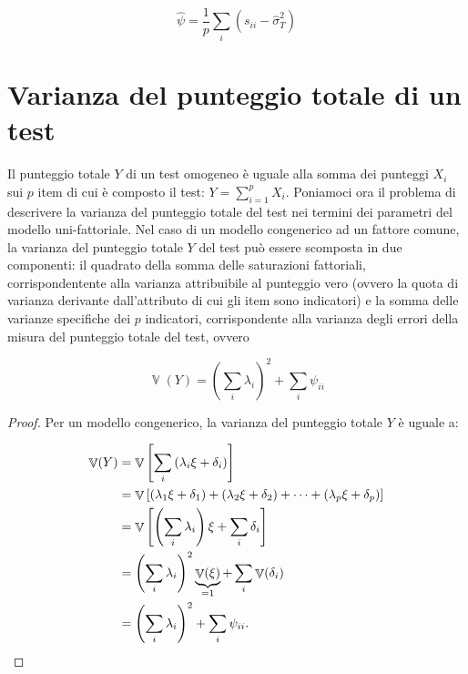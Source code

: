\documentclass[
  11pt,
]{krantz}
\DeclareMathOperator{\V}{\mathbb{V}} %
\theoremstyle{definition}
\theoremstyle{definition}
\theoremstyle{definition}
\theoremstyle{definition}
\theoremstyle{remark}
\begin{document}
\begin{equation}
\hat{\psi} = \frac{1}{p} \sum_i (s_{ii} - \hat{\sigma}_T^2)
\label{eq:psi-par-st}
\end{equation}

\hypertarget{varianza-del-punteggio-totale-di-un-test}{%
\section{Varianza del punteggio totale di un test}\label{varianza-del-punteggio-totale-di-un-test}}

Il punteggio totale \(Y\) di un test omogeneo è uguale alla somma dei punteggi \(X_i\) sui \(p\) item di cui è composto il test: \(Y = \sum_{i=1}^p X_i.\) Poniamoci ora il problema di descrivere la varianza del punteggio totale del test nei termini dei parametri del modello uni-fattoriale. Nel caso di un modello congenerico ad un fattore comune, la varianza del punteggio totale \(Y\) del test può essere scomposta in due componenti: il quadrato della somma delle saturazioni fattoriali, corrispondentente alla varianza attribuibile al punteggio vero (ovvero la quota di varianza derivante dall'attributo di cui gli item sono indicatori) e la somma delle varianze specifiche dei \(p\) indicatori, corrispondente alla varianza degli errori della misura del punteggio totale del test, ovvero

\begin{equation}
 \V(Y) = \left( \sum_i \lambda_i\right)^2 + \sum_i \psi_{ii}
  \label{eq:var-y}
\end{equation}

\begin{proof}
Per un modello congenerico, la varianza del punteggio totale \(Y\) è uguale a:

\begin{equation}
\begin{aligned}
  \V(Y) &= \V\left[ \sum_i  \left(\lambda_i \xi + \delta_i\right)  \right]\notag\\
  &= \V\left[  (\lambda_1 \xi + \delta_1) + (\lambda_2 \xi + \delta_2) + \dots +  (\lambda_p \xi + \delta_p)  \right]\notag\\
  &= \V\left[ \left( \sum_i \lambda_i\right) \xi + \sum_i \delta_i\right]\notag\\
  &=  \left(\sum_i \lambda_i\right)^2 \underbrace{\V(\xi)}_{=1} +  \sum_i  \V(\delta_i)\notag\\
  &= \left(\sum_i \lambda_i\right)^2 + \sum_i \psi_{ii}.\notag
\end{aligned}
\end{equation}
\end{proof}
\end{document}
